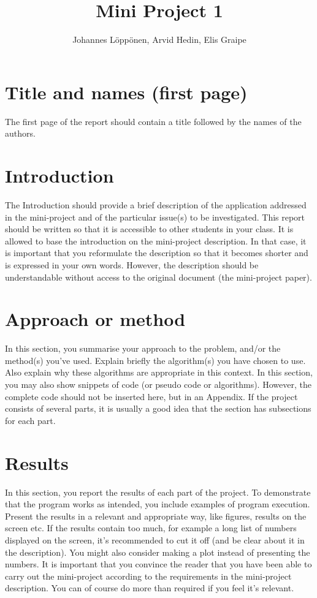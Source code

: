 \documentclass[a4paper,10pt]{article}
\author{Johannes Löppönen, Arvid Hedin, Elis Graipe}
\title{Mini Project 1}
\begin{document}
\maketitle

\section{Title and names (first page)}
The first page of the report should contain a title followed by the names of the authors.

\section{Introduction}
The Introduction should provide a brief description of the application addressed in the mini-project and of the particular issue(s) to be investigated. This report should be written so that it is accessible to other students in your class.
It is allowed to base the introduction on the mini-project description. In that case, it is important that you reformulate the description so that it becomes shorter and is expressed in your own words. However, the description should be understandable without access to the original document (the mini-project paper).

\section{Approach or method}
In this section, you summarise your approach to the problem, and/or the method(s) you've used. Explain briefly the algorithm(s) you have chosen to use. Also explain why these algorithms are appropriate in this context. In this section, you may also show snippets of code (or pseudo code or algorithms). However, the complete code should not be inserted here, but in an Appendix.
If the project consists of several parts, it is usually a good idea that the section has subsections for each part.

\section{Results}
In this section, you report the results of each part of the project. To demonstrate that the program works as intended, you include examples of program execution. Present the results in a relevant and appropriate way, like figures, results on the screen etc. If the results contain too much, for example a long list of numbers displayed on the screen, it's recommended to cut it off (and be clear about it in the description). You might also consider making a plot instead of presenting the numbers.
It is important that you convince the reader that you have been able to carry out the mini-project according to the requirements in the mini-project description. You can of course do more than required if you feel it's relevant.
\end{document}
